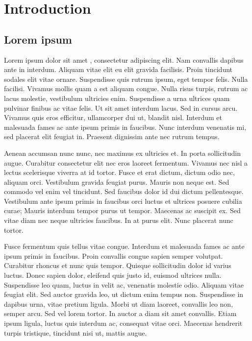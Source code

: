 \chapter{Introduction}

\section{Lorem ipsum}

Lorem ipsum dolor sit amet \cite{fake_citation}, consectetur adipiscing elit. Nam convallis dapibus ante in interdum. Aliquam vitae elit eu elit gravida facilisis. Proin tincidunt sodales elit vitae ornare. Suspendisse quis rutrum ipsum, eget tempor felis. Nulla facilisi. Vivamus mollis quam a est aliquam congue. Nulla risus turpis, rutrum ac lacus molestie, vestibulum ultricies enim. Suspendisse a urna ultrices quam pulvinar finibus ac vitae felis. Ut sit amet interdum lacus. Sed in cursus arcu. Vivamus quis eros efficitur, ullamcorper dui ut, blandit nisl. Interdum et malesuada fames ac ante ipsum primis in faucibus. Nunc interdum venenatis mi, sed placerat elit feugiat in. Praesent dignissim ante nec rutrum tempus.

Aenean accumsan nunc nunc, nec maximus ex ultricies et. In porta sollicitudin augue. Curabitur consectetur elit nec eros laoreet fermentum. Vivamus nec nisl a lectus scelerisque viverra at id tortor. Fusce et erat dictum, dictum odio nec, aliquam orci. Vestibulum gravida feugiat purus. Mauris non neque est. Sed commodo vel enim vel tincidunt. Sed faucibus dolor id dui dictum pellentesque. Vestibulum ante ipsum primis in faucibus orci luctus et ultrices posuere cubilia curae; Mauris interdum tempor purus ut tempor. Maecenas ac suscipit ex. Sed vitae diam nec neque ultricies faucibus. In at purus elit. Nunc placerat nunc tortor.

Fusce fermentum quis tellus vitae congue. Interdum et malesuada fames ac ante ipsum primis in faucibus. Proin convallis congue sapien semper volutpat. Curabitur rhoncus et nunc quis tempor. Quisque sollicitudin dolor id varius luctus. Donec sapien dolor, eleifend quis justo id, euismod ultrices nulla. Suspendisse leo quam, luctus in velit ac, venenatis molestie odio. Aliquam vitae feugiat elit. Sed auctor gravida leo, ut dictum enim tempus non. Suspendisse in dapibus urna, vitae pretium ligula. Morbi ut diam laoreet, convallis leo non, semper arcu. Sed vel lorem tortor. In auctor a diam sit amet convallis. Etiam ipsum ligula, luctus quis interdum ac, consequat vitae orci. Maecenas hendrerit turpis tristique, tincidunt nisi ut, mattis augue.

